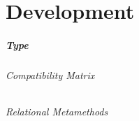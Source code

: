 
\chapter{Development}
\label{cha:Development}

\paragraph*{Type}
\subparagraph*{Compatibility Matrix}
\subparagraph*{Relational Metamethods}



